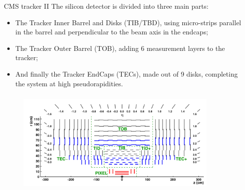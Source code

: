 \documentclass[8pt]{beamer}
\begin{document}
\begin{frame}{CMS tracker II}
\justifying
\vspace{5pt}
The silicon detector is divided into three main parts:
\begin{itemize}
\item The Tracker Inner Barrel and Disks (TIB/TBD), using micro-strips parallel in the barrel and perpendicular to the beam axis in the endcaps;
\item The Tracker Outer Barrel (TOB), adding 6 measurement layers to the tracker;
\item And finally the Tracker EndCaps (TECs), made out of 9 disks, completing the system at high pseudorapidities.
\end{itemize} \vfill

\begin{figure}[htbp]
\begin{center}
\includegraphics[width=10cm, height=5.2cm]{figs/CMSTracker.png}
\end{center}
\end{figure}\vfill
\end{frame}
\end{document}
